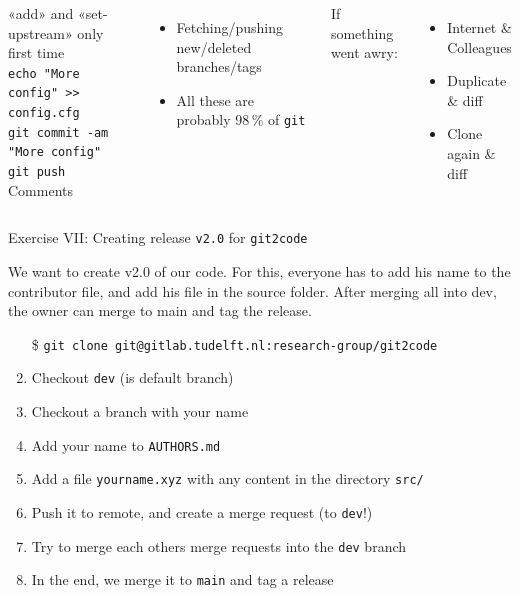 \documentclass[aspectratio=169]{beamer}
\newcommand{\code}[1]{\texttt{\color{mygreen}#1}}
\begin{document}
\begin{frame}[t]
\begin{columns}[t]
    «add» and «set-upstream» only first time\\
    \code{echo "More config" >{}> config.cfg}\\
    \code{git commit -am "More config"}\\
    \code{git push}\\[2em]

    Comments
    \begin{itemize}
      \item Fetching/pushing new/deleted branches/tags
      \item All these are probably 98\,\% of \code{git}
    \end{itemize}
    If something went awry:
      \begin{itemize}
        \item Internet \& Colleagues
        \item Duplicate \& diff
        \item Clone again \& diff
      \end{itemize}

  \end{columns}

\end{frame}

\begin{frame}
  {Exercise VII: Creating release \code{v2.0} for \code{git2code}}

  We want to create v2.0 of our code. For this, everyone has to add his name to
  the contributor file, and add his file in the source folder. After merging
  all into dev, the owner can merge to main and tag the release.

  \begin{enumerate}
    \item[\$] \code{git clone git@gitlab.tudelft.nl:research-group/git2code}
    \item Checkout \code{dev} (is default branch)
    \item Checkout a branch with your name
    \item Add your name to \code{AUTHORS.md}
    \item Add a file \code{yourname.xyz} with any content in the directory
      \code{src/}
    \item Push it to remote, and create a merge request (to \code{dev}!)
    \item Try to merge each others merge requests into the \code{dev} branch
    \item In the end, we merge it to \code{main} and tag a release
  \end{enumerate}

\end{frame}
\end{document}
